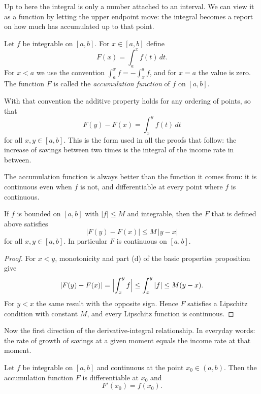 Up to here the integral is only a number attached to an interval. We can
view it as a function by letting the upper endpoint move: the integral becomes
a report on how much has accumulated up to that point.

\begin{definisi}
Let $f$ be integrable on $[a,b]$. For $x\in[a,b]$ define
\[
F(x)=\int_a^x f(t)\,dt .
\]
For $x<a$ we use the convention $\int_a^x f=-\int_x^a f$, and for $x=a$ the value is
zero. The function $F$ is called the \emph{accumulation function} of $f$ on $[a,b]$.
\end{definisi}

With that convention the additive property holds for any ordering of points, so that
\begin{equation}
F(y)-F(x)=\int_x^{y} f(t)\,dt
\end{equation}
for all $x,y\in[a,b]$. This is the form used in all the proofs that follow:
the increase of savings between two times is the integral of the income rate in between.

The accumulation function is always better than the function it comes from: it is continuous even when $f$
is not, and differentiable at every point where $f$ is continuous.

\begin{proposisi}
If $f$ is bounded on $[a,b]$ with $|f|\le M$ and integrable, then the $F$ that
is defined above satisfies
\[
|F(y)-F(x)|\le M\,|y-x|
\]
for all $x,y\in[a,b]$. In particular $F$ is continuous on $[a,b]$.
\end{proposisi}

\begin{proof}
For $x<y$, monotonicity and part (d) of the basic properties proposition give
\[
|F(y)-F(x)|=\Bigl|\int_x^{y}f\Bigr|\le\int_x^{y}|f|\le M(y-x).
\]
For $y<x$ the same result with the opposite sign. Hence $F$ satisfies a
Lipschitz condition with constant $M$, and every Lipschitz function is continuous.
\end{proof}

Now the first direction of the derivative-integral relationship. In everyday words: the rate of
growth of savings at a given moment equals the income rate at that moment.

\begin{teorema}
Let $f$ be integrable on $[a,b]$ and continuous at the point $x_0\in(a,b)$. Then the
accumulation function $F$ is differentiable at $x_0$ and
\[
F'(x_0)=f(x_0).
\]
\end{teorema}

